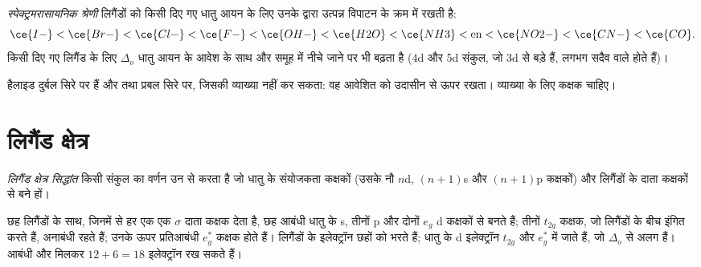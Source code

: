 \begin{definition}[स्पेक्ट्रमरासायनिक श्रेणी]\label{def:b2:ligand-field:spectrochemical}
\emph{स्पेक्ट्रमरासायनिक श्रेणी} लिगैंडों को किसी दिए गए
धातु आयन के लिए उनके द्वारा उत्पन्न विपाटन के क्रम में रखती है:
\[
  \ce{I-} < \ce{Br-} < \ce{Cl-} < \ce{F-} < \ce{OH-} < \ce{H2O} < \ce{NH3} < \text{en} <
  \ce{NO2-} < \ce{CN-} < \ce{CO} .
\]
किसी दिए गए लिगैंड के लिए $\Delta_o$ धातु आयन के आवेश के साथ और समूह में नीचे जाने पर भी बढ़ता है
(4d और 5d संकुल, जो 3d से बड़े हैं, लगभग सदैव  वाले होते हैं)।
\end{definition}

हैलाइड दुर्बल सिरे पर हैं और  तथा  प्रबल सिरे पर, जिसकी
 व्याख्या नहीं कर सकता: वह आवेशित  को उदासीन
 से ऊपर रखता। व्याख्या के लिए कक्षक चाहिए।

\section{लिगैंड क्षेत्र}

\begin{definition}[लिगैंड क्षेत्र सिद्धांत]\label{def:b2:ligand-field:ligand-field}
\emph{लिगैंड क्षेत्र सिद्धांत} किसी संकुल का वर्णन उन  से करता है
जो धातु के संयोजकता कक्षकों (उसके नौ $n$d, $(n+1)$s और $(n+1)$p
कक्षकों) और लिगैंडों के दाता कक्षकों से बने हों।
\end{definition}

\begin{proposition}\label{prop:b2:ligand-field:mo-octahedral}
छह लिगैंडों के साथ, जिनमें से हर एक एक $\sigma$ दाता कक्षक देता है, छह आबंधी 
धातु के s, तीनों p और दोनों $e_g$ d कक्षकों से बनते हैं; तीनों $t_{2g}$ कक्षक, जो
लिगैंडों के बीच इंगित करते हैं, अनाबंधी रहते हैं; उनके ऊपर प्रतिआबंधी $e_g^*$
कक्षक होते हैं। लिगैंडों के इलेक्ट्रॉन छहों  को भरते हैं; धातु के d इलेक्ट्रॉन
$t_{2g}$ और $e_g^*$ में जाते हैं, जो $\Delta_o$ से अलग हैं। आबंधी और  मिलकर
$12 + 6 = 18$ इलेक्ट्रॉन रख सकते हैं।
\end{proposition}

